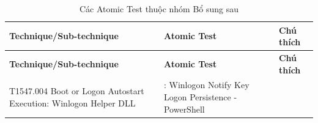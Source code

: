\begingroup
\small
\renewcommand{\arraystretch}{1.12}
\setlength{\LTpre}{0pt}
\setlength{\LTpost}{0pt}
\begin{longtable}{|>{\raggedright\arraybackslash}p{3.2cm}|>{\raggedright\arraybackslash}p{5.5cm}|>{\raggedright\arraybackslash}p{5.8cm}|}
\caption{Các Atomic Test thuộc nhóm Bổ sung sau}\label{tab:bo-sung-sau}\\
\hline
\textbf{Technique/Sub-technique} & \textbf{Atomic Test} & \textbf{Chú thích} \\
\hline
\endfirsthead
\hline
\textbf{Technique/Sub-technique} & \textbf{Atomic Test} & \textbf{Chú thích} \\
\hline
\endhead
\hline
\endfoot
\hline
\endlastfoot
T1547.004 Boot or Logon Autostart Execution: Winlogon Helper DLL & 3: Winlogon Notify Key Logon Persistence - PowerShell &  \\
\hline
\end{longtable}
\endgroup
